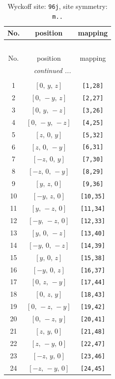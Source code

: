 \documentclass[fleqn,8pt]{jsarticle}
\begin{document}
\begin{longtable}{ccc}
\caption{Wyckoff site: {\tt 96j}, site symmetry: {\tt m..}}
 \\
 \hline \hline
No. & position & mapping \\ \hline \endfirsthead

\multicolumn{2}{l}{\tablename\ \thetable{}} \\
 \hline \hline
No. & position & mapping \\ \hline \endhead

 \hline \hline
\multicolumn{2}{r}{\footnotesize\it continued ...} \\ \endfoot

 \hline \hline
\multicolumn{2}{r}{} \\ \endlastfoot

1 & $\left[ 0,\, y,\, z \right]$ & {\tt [1,28]} \\ \hline
2 & $\left[ 0,\, - y,\, z \right]$ & {\tt [2,27]} \\ \hline
3 & $\left[ 0,\, y,\, - z \right]$ & {\tt [3,26]} \\ \hline
4 & $\left[ 0,\, - y,\, - z \right]$ & {\tt [4,25]} \\ \hline
5 & $\left[ z,\, 0,\, y \right]$ & {\tt [5,32]} \\ \hline
6 & $\left[ z,\, 0,\, - y \right]$ & {\tt [6,31]} \\ \hline
7 & $\left[ - z,\, 0,\, y \right]$ & {\tt [7,30]} \\ \hline
8 & $\left[ - z,\, 0,\, - y \right]$ & {\tt [8,29]} \\ \hline
9 & $\left[ y,\, z,\, 0 \right]$ & {\tt [9,36]} \\ \hline
10 & $\left[ - y,\, z,\, 0 \right]$ & {\tt [10,35]} \\ \hline
11 & $\left[ y,\, - z,\, 0 \right]$ & {\tt [11,34]} \\ \hline
12 & $\left[ - y,\, - z,\, 0 \right]$ & {\tt [12,33]} \\ \hline
13 & $\left[ y,\, 0,\, - z \right]$ & {\tt [13,40]} \\ \hline
14 & $\left[ - y,\, 0,\, - z \right]$ & {\tt [14,39]} \\ \hline
15 & $\left[ y,\, 0,\, z \right]$ & {\tt [15,38]} \\ \hline
16 & $\left[ - y,\, 0,\, z \right]$ & {\tt [16,37]} \\ \hline
17 & $\left[ 0,\, z,\, - y \right]$ & {\tt [17,44]} \\ \hline
18 & $\left[ 0,\, z,\, y \right]$ & {\tt [18,43]} \\ \hline
19 & $\left[ 0,\, - z,\, - y \right]$ & {\tt [19,42]} \\ \hline
20 & $\left[ 0,\, - z,\, y \right]$ & {\tt [20,41]} \\ \hline
21 & $\left[ z,\, y,\, 0 \right]$ & {\tt [21,48]} \\ \hline
22 & $\left[ z,\, - y,\, 0 \right]$ & {\tt [22,47]} \\ \hline
23 & $\left[ - z,\, y,\, 0 \right]$ & {\tt [23,46]} \\ \hline
24 & $\left[ - z,\, - y,\, 0 \right]$ & {\tt [24,45]} \\
\end{longtable}
\end{document}
